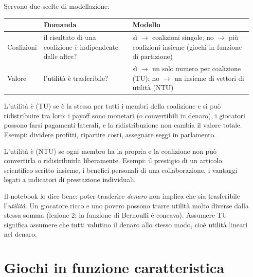 Servono due scelte di modellazione:
\begin{center}
\renewcommand{\arraystretch}{1.3}
\begin{tabularx}{\linewidth}{@{}l X X@{}}
\toprule
 & Domanda & Modello \\
\midrule
Coalizioni & il risultato di una coalizione è indipendente dalle altre? &
 sì $\to$ coalizioni singole; no $\to$ più coalizioni insieme (giochi in funzione di
 partizione) \\
Valore & l'utilità è trasferibile? & sì $\to$ un solo numero per coalizione (TU);
 no $\to$ un insieme di vettori di utilità (NTU) \\
\bottomrule
\end{tabularx}
\end{center}

\begin{definizione}
L'utilità è  (TU) se è la stessa per tutti i membri della coalizione e si
può ridistribuire tra loro: i payoff sono monetari (o convertibili in denaro), i giocatori
possono farsi pagamenti laterali, e la ridistribuzione non cambia il valore totale.
Esempi: dividere profitti, ripartire costi, assegnare seggi in parlamento.

L'utilità è  (NTU) se ogni membro ha la propria e la coalizione non
può convertirla o ridistribuirla liberamente. Esempi: il prestigio di un articolo scientifico
scritto insieme, i benefici personali di una collaborazione, i vantaggi legati a indicatori
di prestazione individuali.
\end{definizione}

\begin{attenzione}
Il notebook lo dice bene: poter trasferire \emph{denaro} non implica che sia trasferibile
l'\emph{utilità}. Un giocatore ricco e uno povero possono trarre utilità molto diverse dalla
stessa somma (lezione 2: la funzione di Bernoulli è concava). Assumere TU significa assumere
che tutti valutino il denaro allo stesso modo, cioè utilità lineari nel denaro.
\end{attenzione}

\section{Giochi in funzione caratteristica}

